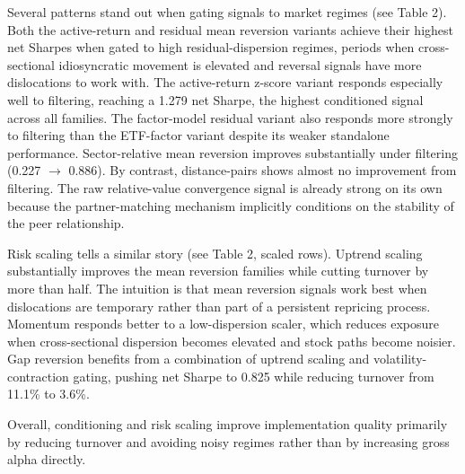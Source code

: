 \documentclass{article}
\begin{document}
Several patterns stand out when gating signals to market regimes (see Table 2). Both the active-return and residual mean reversion variants achieve their highest net Sharpes when gated to high residual-dispersion regimes, periods when cross-sectional idiosyncratic movement is elevated and reversal signals have more dislocations to work with. The active-return z-score variant responds especially well to filtering, reaching a 1.279 net Sharpe, the highest conditioned signal across all families. The factor-model residual variant also responds more strongly to filtering than the ETF-factor variant despite its weaker standalone performance. Sector-relative mean reversion improves substantially under filtering (0.227 $\to$ 0.886). By contrast, distance-pairs shows almost no improvement from filtering. The raw relative-value convergence signal is already strong on its own because the partner-matching mechanism implicitly conditions on the stability of the peer relationship.

Risk scaling tells a similar story (see Table 2, scaled rows). Uptrend scaling substantially improves the mean reversion families while cutting turnover by more than half. The intuition is that mean reversion signals work best when dislocations are temporary rather than part of a persistent repricing process. Momentum responds better to a low-dispersion scaler, which reduces exposure when cross-sectional dispersion becomes elevated and stock paths become noisier. Gap reversion benefits from a combination of uptrend scaling and volatility-contraction gating, pushing net Sharpe to 0.825 while reducing turnover from 11.1\% to 3.6\%.

Overall, conditioning and risk scaling improve implementation quality primarily by reducing turnover and avoiding noisy regimes rather than by increasing gross alpha directly.
\end{document}
